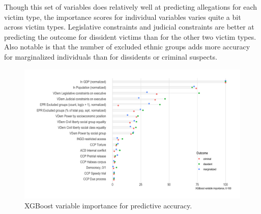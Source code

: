 \documentclass[11pt]{article}
\begin{document}
Though this set of variables does relatively well at predicting allegations for each victim type, the importance scores for individual variables varies quite a bit across victim types. Legislative constraints and judicial constraints are better at predicting the outcome for dissident victims than for the other two victim types. Also notable is that the number of excluded ethnic groups adds more accuracy for marginalized individuals than for dissidents or criminal suspects. 

\begin{figure}
\begin{center}
\caption{XGBoost variable importance for predictive accuracy.}
\label{var-imp}
\includegraphics[width=.99\textwidth]{../output/figures/xgboost-variable-importance-v1.png}
\end{center}
\end{figure}

\end{document}
